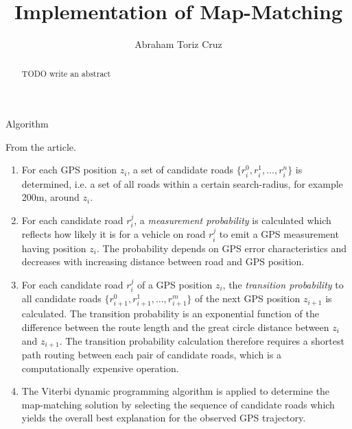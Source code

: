 \documentclass[10pt,letterpaper]{article}
\author{Abraham Toriz Cruz}
\title{Implementation of Map-Matching}
\begin{document}
\maketitle

\begin{abstract}
TODO write an abstract
\end{abstract}

\begin{section}{Algorithm}

From the article.

\begin{enumerate}
	\item For each GPS position $z_i$, a set of candidate roads $\{r_i^0, r_i^1, \dots, r_i^n\}$ is determined, i.e. a set of all roads within a certain search-radius, for example 200m, around $z_i$.

	\item For each candidate road $r_i^j$, a \emph{measurement probability} is calculated which reflects how likely it is for a vehicle on road $r_i^j$ to emit a GPS measurement having position $z_i$. The probability depends on GPS error characteristics and decreases with increasing distance between road and GPS position.

	\item For each candidate road $r_i^j$ of a GPS position $z_i$, the \emph{transition probability} to all candidate roads $\{r_{i+1}^0, r_{i+1}^1, \dots, r_{i+1}^m\}$ of the next GPS position $z_{i+1}$ is calculated. The transition probability is an exponential function of the difference between the route length and the great circle distance between $z_i$ and $z_{i+1}$. The transition probability calculation therefore requires a shortest path routing between each pair of candidate roads, which is a computationally expensive operation.

	\item The Viterbi dynamic programming algorithm is applied to determine the map-matching solution by selecting the sequence of candidate roads which yields the overall best explanation for the observed GPS trajectory.
\end{enumerate}

\end{section}
\end{document}
